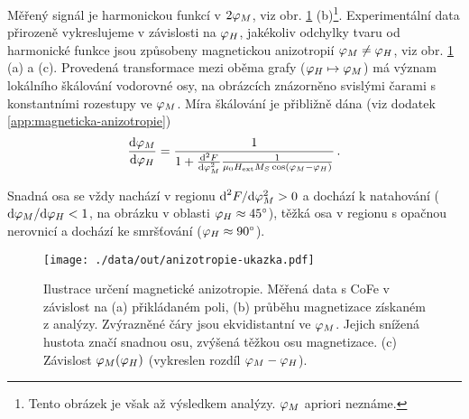 Měřený signál je harmonickou funkcí v $2\varphi_M$, viz obr. \ref{fig:anizotropie-vizualni} (b)\footnote{Tento obrázek je však až výsledkem analýzy. $\varphi_M$ apriori neznáme.}.
Experimentální data přirozeně vykreslujeme v závislosti na $\varphi_H$, jakékoliv odchylky tvaru od harmonické funkce jsou způsobeny magnetickou anizotropií $\varphi_M\neq\varphi_H$, viz obr. \ref{fig:anizotropie-vizualni} (a) a (c).
Provedená transformace mezi oběma grafy ($\varphi_H \mapsto \varphi_M$) má význam lokálního škálování vodorovné osy, na obrázcích znázorněno svislými čarami s konstantními rozestupy ve $\varphi_M$.
Míra škálování je přibližně dána (viz dodatek \ref{app:magneticka-anizotropie})
\begin{equation}
    \frac{\textrm{d}\varphi_M}{\textrm{d}\varphi_H} = \frac{1}{1+\frac{\textrm{d}^2 F}{\textrm{d}\varphi_M^2}\frac{1}{\mu_0 H_\textrm{ext} M_S \cos(\varphi_M-\varphi_H)}} \,.
\end{equation}

Snadná osa se vždy nachází v regionu $\textrm{d}^2F/\textrm{d}\varphi_M^2 > 0$ a dochází k natahování ($\textrm{d}\varphi_M/\textrm{d}\varphi_H < 1$, na obrázku v oblasti $\varphi_H\approx\SI{45}{\degree}$), těžká osa v regionu s opačnou nerovnicí a dochází ke smršťování ($\varphi_H\approx\SI{90}{\degree}$).

\begin{figure}[htbp]
    \centering
    \texttt{[image: ./data/out/anizotropie-ukazka.pdf]}
    \caption{Ilustrace určení magnetické anizotropie. Měřená data s CoFe v závislost na (a) přikládaném poli, (b) průběhu magnetizace získaném z analýzy.
    Zvýrazněné čáry jsou ekvidistantní ve $\varphi_M$. Jejich snížená hustota značí snadnou osu, zvýšená těžkou osu magnetizace. (c) Závislost $\varphi_M(\varphi_H)$ (vykreslen rozdíl $\varphi_M-\varphi_H$).}
    \label{fig:anizotropie-vizualni}
\end{figure}


